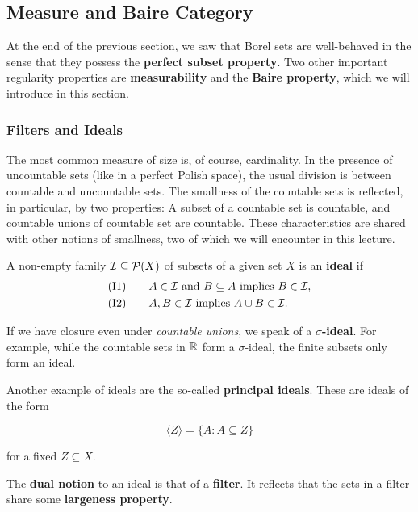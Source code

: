 \subsection{Measure and Baire Category}

At the end of the previous section, we saw that Borel sets are well-behaved in the sense that they possess the \textbf{perfect subset property}. Two other important regularity properties are \textbf{measurability} and the \textbf{Baire property}, which we will introduce in this section.

\subsubsection{Filters and Ideals}

The most common measure of size is, of course, cardinality. In the presence of uncountable sets (like in a perfect Polish space), the usual division is between countable and uncountable sets. The smallness of the countable sets is reflected, in particular, by two properties: A subset of a countable set is countable, and countable unions of countable set are countable. These characteristics are shared with other notions of smallness, two of which we will encounter in this lecture.

\begin{definition}\label{def-ideal}A non-empty family $\mathcal{I} \subseteq \mathcal{P}(X)$ of subsets of a given set $X$ is an \textbf{ideal} if
\begin{align*}
(\operatorname{I1}) & \qquad A \in \mathcal{I} \text{ and } B \subseteq A \text{ implies } B \in \mathcal{I},\\
(\operatorname{I2}) & \qquad A, B \in \mathcal{I}  \text{ implies } A \cup B \in\mathcal{I}.
\end{align*}
\end{definition}If we have closure even under \textit{countable unions}, we speak of a \textbf{$\sigma$-ideal}. For example, while the countable sets in $\mathbb{R}$ form a $\sigma$-ideal, the finite subsets only form an ideal.

Another example of ideals are the so-called \textbf{principal ideals}. These are ideals of the form

\begin{equation}
\langle Z \rangle = \{ A \colon A \subseteq Z\}
\end{equation}

for a fixed $Z \subseteq X$.

The \textbf{dual notion} to an ideal is that of a \textbf{filter}. It reflects that the sets in a filter share some \textbf{largeness property}.

